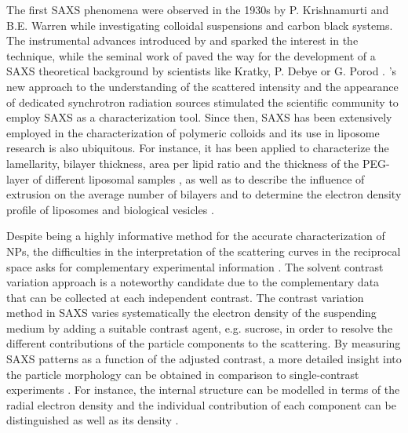 The first SAXS phenomena were observed in the 1930s by P. Krishnamurti and B.E. Warren \citep{krishnamurti_saxs_1930, warren_xray_1934} while investigating colloidal suspensions and carbon black systems. The instrumental advances introduced by \cite{kratky_berechnung_1938} and \cite{guinier_dispositif_1937} sparked the interest in the technique, while the seminal work of \cite{guinier_diffraction_1939} paved the way for the development of a SAXS theoretical background by scientists like Kratky, P. Debye or G. Porod \citep{kratky_bestimmung_1943,debye_scattering_1949,kratky_diffuse_1949,guinier_study_1950,guinier_small-angle_1955}. \cite{stuhrmann_elimination_1965}'s new approach to the understanding of the scattered intensity \citep{stuhrmann_elimination_1965} and the appearance of dedicated synchrotron radiation sources stimulated the scientific community to employ SAXS as a characterization tool. Since then, SAXS has been extensively employed in the characterization of polymeric colloids \citep{dingenouts_analysis_1999,chu_small-angle_2001,ballauff_analysis_2011} and its use in liposome research is also ubiquitous. For instance, it has been applied to characterize the lamellarity, bilayer thickness, area per lipid ratio \citep{pabst_applications_2010,bouwstra_small_1993,brzustowicz_x-ray_2005} and the thickness of the PEG-layer of different liposomal samples \citep{varga_closer_2010,varga_characterization_2012}, as well as to describe the influence of extrusion on the average number of bilayers \citep{jousma_characterization_1987} and to determine the electron density profile of liposomes \citep{bouwstra_small_1993,brzustowicz_x-ray_2005,hirai_determination_2003} and biological vesicles \citep{castorph_structure_2010}.

Despite being a highly informative method for the accurate characterization of NPs, the difficulties in the interpretation of the scattering curves in the reciprocal space asks for complementary experimental information \citep{mykhaylyk_structural_2012}. The solvent contrast variation approach is a noteworthy candidate due to the complementary data that can be collected at each independent contrast. The contrast variation method in SAXS varies systematically the electron density of the suspending medium by adding a suitable contrast agent, e.g. sucrose, in order to resolve the different contributions of the particle components to the scattering. By measuring SAXS patterns as a function of the adjusted contrast, a more detailed insight into the particle morphology can be obtained in comparison to single-contrast experiments \citep{bolze_situ_2004}. For instance, the internal structure can be modelled in terms of the radial electron density \citep{dingenouts_radial_1994,dingenouts_analysis_1999,ballauff_analysis_2011,ballauff_small-angle_1996} and the individual contribution of each component can be distinguished \citep{beyer_saxs_1990,grunder_analysis_1991,grunder_small-angle_1993,ottewill_characterization_1995,bolze_small-angle_1997,dingenouts_structure_1994} as well as its density \citep{mykhaylyk_application_2007}.

